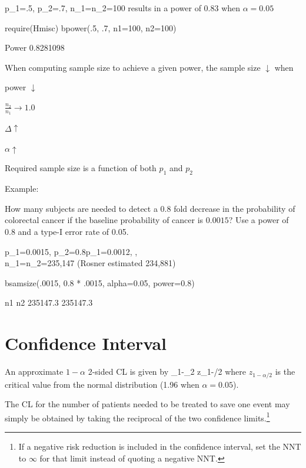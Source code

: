 \beq
p_{1}=.5, p_{2}=.7, n_{1}=n_{2}=100
\eeq
results in a power of 0.83 when $\alpha=0.05$
\begin{Schunk}
\begin{Sinput}
require(Hmisc)
bpower(.5, .7, n1=100, n2=100)
\end{Sinput}
\begin{Soutput}
    Power 
0.8281098 
\end{Soutput}
\end{Schunk}
\item When computing sample size to achieve a given power, the sample
  size $\downarrow$ when
 \bi
 \item power $\downarrow$
 \item $\frac{n_{2}}{n_{1}} \rightarrow 1.0$
 \item $\Delta \uparrow$
 \item $\alpha \uparrow$
 \ei
\item Required sample size is a function of both $p_{1}$ and $p_{2}$
\item Example:

How many subjects are needed to detect a 0.8 fold decrease in the probability of colorectal cancer if the baseline probability of cancer is $0.0015$?  Use a power of 0.8 and a type-I error rate of 0.05.

\beqa
p_{1}=0.0015, p_{2}=0.8\times p_{1}=0.0012, ,  \\
n_{1}=n_{2}=235,147
\eeqa
(Rosner estimated 234,881)
\ei
\begin{Schunk}
\begin{Sinput}
bsamsize(.0015, 0.8 * .0015, alpha=0.05, power=0.8)
\end{Sinput}
\begin{Soutput}
      n1       n2 
235147.3 235147.3 
\end{Soutput}
\end{Schunk}

\section{Confidence Interval}
An approximate $1-\alpha$ 2-sided CL is given by
\beq
{}_{1}-_{2} \pm z_{1-\alpha/2} \times{}
\eeq
where $z_{1-\alpha/2}$ is the critical value from the normal
distribution (1.96 when $\alpha=0.05$).

The CL for the number of patients needed to be treated to save one
event may simply be obtained by taking the reciprocal of the two
confidence limits.\footnote{If a negative risk reduction is included
  in the confidence interval, set the NNT to $\infty$ for that limit
  instead of quoting a negative NNT.}

